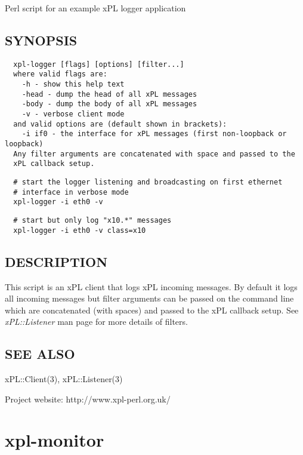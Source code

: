 \documentclass[12pt,a4paper]{article}
\begin{document}
Perl script for an example xPL logger application

\subsection*{SYNOPSIS\label{xpl-logger_SYNOPSIS}}
\begin{verbatim}
  xpl-logger [flags] [options] [filter...]
  where valid flags are:
    -h - show this help text
    -head - dump the head of all xPL messages
    -body - dump the body of all xPL messages
    -v - verbose client mode
  and valid options are (default shown in brackets):
    -i if0 - the interface for xPL messages (first non-loopback or loopback)
  Any filter arguments are concatenated with space and passed to the
  xPL callback setup.
\end{verbatim}
\begin{verbatim}
  # start the logger listening and broadcasting on first ethernet
  # interface in verbose mode
  xpl-logger -i eth0 -v
\end{verbatim}
\begin{verbatim}
  # start but only log "x10.*" messages
  xpl-logger -i eth0 -v class=x10
\end{verbatim}
\subsection*{DESCRIPTION\label{xpl-logger_DESCRIPTION}}


This script is an xPL client that logs xPL incoming messages.  By
default it logs all incoming messages but filter arguments can be
passed on the command line which are concatenated (with spaces) and
passed to the xPL callback setup.  See \emph{xPL::Listener} man page for
more details of filters.

\subsection*{SEE ALSO\label{xpl-logger_SEE_ALSO}}


xPL::Client(3), xPL::Listener(3)



Project website: http://www.xpl-perl.org.uk/

\newpage
\section{xpl-monitor\label{xpl-monitor}}
\end{document}
